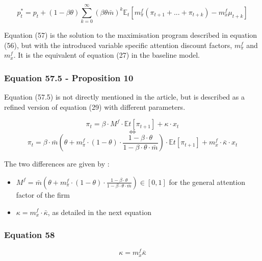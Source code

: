 \documentclass{article}
\begin{document}
\begin{equation}\tag{57}
    p^{*}_{t}=p_{t}+(1-\beta\theta)\sum^{\infty}_{k=0} \left(\beta\theta\bar{m}\right)^{k}\mathbb{E}_{t}\left[m^{f}_{\pi}(\pi_{t+1}+...+\pi_{t+k})-m^{f}_{x}\mu_{t+k}\right]
\end{equation}

Equation (57) is the solution to the maximisation program described in equation (56), but with the introduced variable specific attention discount factors, $m^{f}_{\pi}$ and $m^{f}_{x}$.
It is the equivalent of equation (27) in the baseline model. 

\subsubsection*{Equation 57.5 - Proposition 10}

Equation (57.5) is not directly mentioned in the article, but is described as a refined version of equation (29) with different parameters.

\begin{equation}\tag{57.5}
    \pi_{t}=\beta\cdot M^{f}\cdot\mathbb{E}t\left[\pi_{t+1}\right]+\kappa\cdot x_{t}
\end{equation}
$$\iff$$
\begin{equation}\tag{57.5}
    \pi_{t}=\beta\cdot\bar{m}\left(\theta+m^{f}_{\pi}\cdot(1-\theta)\cdot\frac{1-\beta\cdot\theta}{1-\beta\cdot\theta\cdot\bar{m}}\right)\cdot\mathbb{E}t\left[\pi_{t+1}\right]+m_{x}^{f}\cdot\bar{\kappa}\cdot x_{t}
\end{equation}

The two differences are given by : 
\begin{itemize}
    \item $M^{f}=\bar{m}\left(\theta+m^{f}_{\pi}\cdot(1-\theta)\cdot\frac{1-\beta\cdot\theta}{1-\beta\cdot\theta\cdot\bar{m}}\right)\in\left[0,1\right]$ for the general attention factor of the firm
    \item $\kappa=m_{x}^{f}\cdot\bar{\kappa}$, as detailed in the next equation
\end{itemize}

\subsubsection*{Equation 58}

\begin{equation}\tag{58}
    \kappa = m^{f}_{x}\bar{\kappa}
\end{equation}
\end{document}
